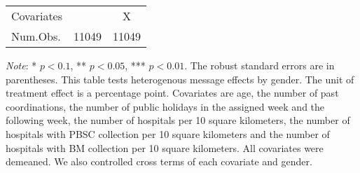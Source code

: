\documentclass[12pt, a4paper]{article}
\begin{document}
\begin{table}[H]
\begin{threeparttable}
\begin{tabular}[t]{>{\raggedright\arraybackslash}p{30em}cc}
Covariates &  & X\\
Num.Obs. & \num{11049} & \num{11049}\\
\bottomrule
\end{tabular}
\begin{tablenotes}
\item \emph{Note}: * $p < 0.1$, ** $p < 0.05$, *** $p < 0.01$. The robust standard errors are in parentheses. This table tests heterogenous message effects by gender. The unit of treatment effect is a percentage point. Covariates are age, the number of past coordinations, the number of public holidays in the assigned week and the following week, the number of hospitals per 10 square kilometers, the number of hospitals with PBSC collection per 10 square kilometers and the number of hospitals with BM collection per 10 square kilometers. All covariates were demeaned. We also controlled cross terms of each covariate and gender.
\end{tablenotes}
\end{threeparttable}
\end{table}
\end{document}
